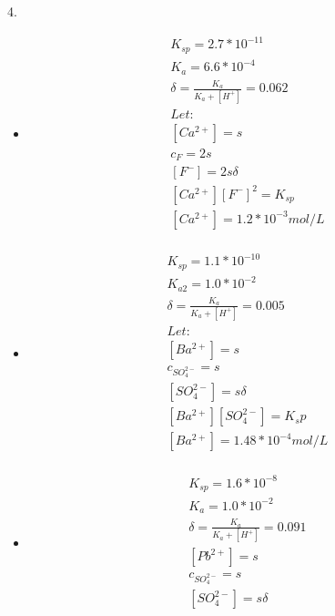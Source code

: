 \documentclass{article}
\begin{document}
4.\begin{itemize}
    \item 
    \begin{equation}
        \begin{multlined}
            K_{sp} = 2.7*10^{-11}\\
            K_a = 6.6*10^{-4}\\
            \delta = \frac{K_a}{K_a+[H^+]} = 0.062\\
            Let:\\
            [Ca^{2+}] = s\\
            c_F = 2s\\
            [F^-] = 2s\delta\\
            [Ca^{2+}][F^-]^2 = K_{sp}\\
            [Ca^{2+}] = 1.2*10^{-3} mol/L\\
        \end{multlined}
    \end{equation}
    \item
    \begin{equation}
        \begin{multlined}
            K_{sp} = 1.1*10^{-10}\\
            K_{a2} = 1.0*10^{-2}\\
            \delta = \frac{K_a}{K_a+[H^+]} = 0.005\\
            Let:\\
            [Ba^{2+}] = s\\
            c_{SO_4^{2-}} = s\\
            [SO_4^{2-}] = s\delta\\
            [Ba^{2+}][SO_4^{2-}] = K_sp\\
            [Ba^{2+}] = 1.48*10^{-4} mol/L\\
        \end{multlined}
    \end{equation}
    \item
    \begin{equation}
        \begin{multlined}
            K_{sp} = 1.6*10^{-8}\\
            K_a = 1.0*10^{-2}\\
            \delta = \frac{K_a}{K_a+[H^+]} = 0.091\\
            [Pb^{2+}] = s\\
            c_{SO_4^{2-}} = s\\
            [SO_4^{2-}] = s\delta\\

\end{multlined}
\end{equation}
\end{itemize}
\end{document}
